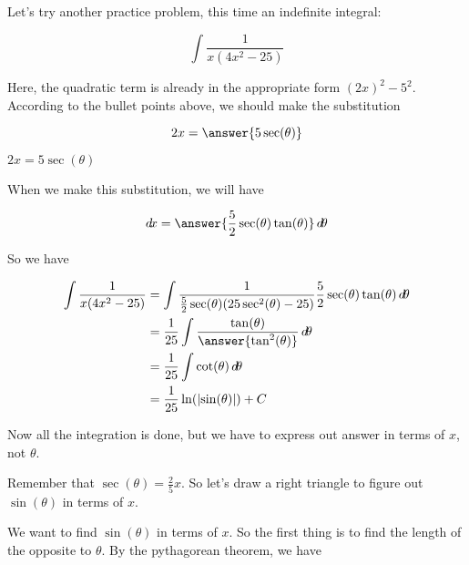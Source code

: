 \documentclass{ximera}
\begin{document}
Let's try another practice problem, this time an indefinite integral:


\begin{example}
	\[
	\int \frac{1}{x(4x^2 - 25)}
	\]
	
	Here, the quadratic term is already in the appropriate form $(2x)^2-5^2$.  According to the bullet points above, we should make the substitution
	
	\[
	2x = \answer{5\sec(\theta)}
	\]
	
	\begin{hint}
		$2x = 5\sec(\theta)$
	\end{hint}
	
	When we make this substitution, we will have
	
	\[
	\d x = \answer{\frac{5}{2} \sec(\theta) \tan(\theta)} \d \theta
	\]
	
	So we have
	
	\begin{align*}
		\int \frac{1}{x(4x^2 - 25)} &= \int \frac{1}{\frac{5}{2} \sec(\theta) (25\sec^2(\theta) - 25)}\frac{5}{2} \sec(\theta) \tan(\theta) \d \theta \\
				&=\frac{1}{25} \int \frac{\tan(\theta)}{\answer{\tan^2(\theta)}} \d \theta\\
				&=\frac{1}{25} \int \cot(\theta) \d \theta\\
				&=\frac{1}{25} \ln(\left| \sin(\theta) \right| )+C
	\end{align*}
	
	Now all the integration is done, but we have to express out answer in terms of $x$, not $\theta$.  
	
	Remember that $\sec(\theta)  =\frac{2}{5} x$. So let's draw a right triangle to figure out $\sin(\theta)$ in terms of $x$.
	
	\begin{image}
    \end{image}

	We want to find $\sin(\theta)$ in terms of $x$.  So the first thing is to find the length of the opposite to $\theta$.  By the pythagorean theorem, we have
	

\end{example}
\end{document}
